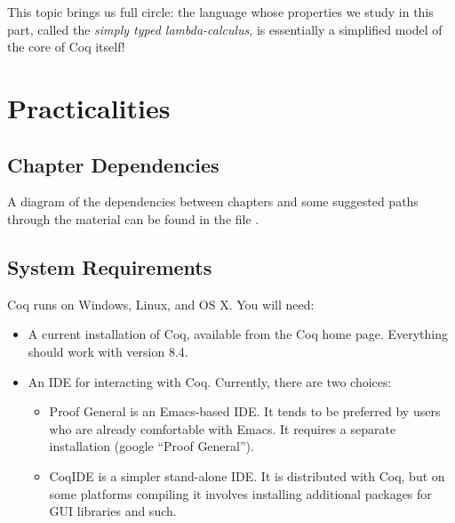 \documentclass[12pt]{report}
\begin{document}
    This topic brings us full circle: the language whose properties we
    study in this part, called the \textit{simply typed lambda-calculus}, is
    essentially a simplified model of the core of Coq itself!


\begin{coqdoccode}
\coqdocemptyline
\end{coqdoccode}
\section{Practicalities}

\begin{coqdoccode}
\coqdocemptyline
\end{coqdoccode}
\subsection{Chapter Dependencies}



 A diagram of the dependencies between chapters and some suggested
    paths through the material can be found in the file . \begin{coqdoccode}
\coqdocemptyline
\end{coqdoccode}
\subsection{System Requirements}



 Coq runs on Windows, Linux, and OS X.  You will need:



\begin{itemize}
\item  A current installation of Coq, available from the Coq home
         page.  Everything should work with version 8.4.



\item  An IDE for interacting with Coq.  Currently, there are two
         choices:



\begin{itemize}
\item  Proof General is an Emacs-based IDE.  It tends to be
             preferred by users who are already comfortable with
             Emacs.  It requires a separate installation (google
             ``Proof General'').



\item  CoqIDE is a simpler stand-alone IDE.  It is distributed
             with Coq, but on some platforms compiling it involves
             installing additional packages for GUI libraries and
             such. 
\end{itemize}

\end{itemize}
\begin{coqdoccode}
\coqdocemptyline
\end{coqdoccode}
\end{document}
